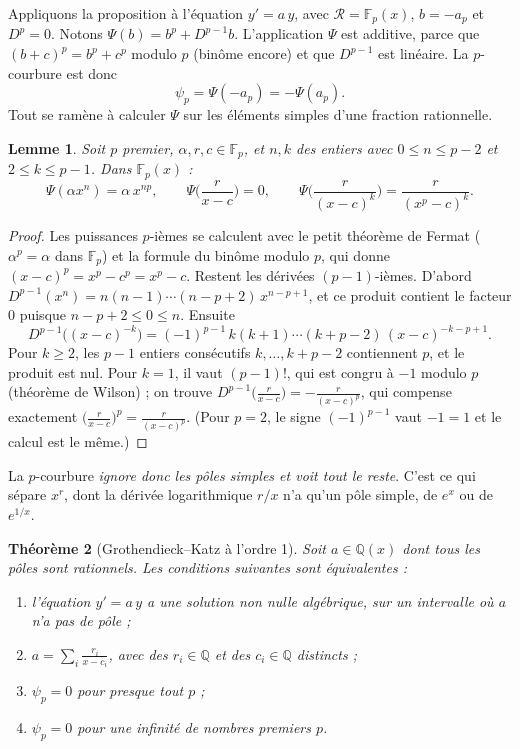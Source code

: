 \documentclass[11pt,a4paper]{article}
\theoremstyle{plain}
\newtheorem{theoreme}{Théorème}[section]
\newtheorem{lemme}[theoreme]{Lemme}
\theoremstyle{definition}
\theoremstyle{remark}
\newcommand{\Q}{\mathbb{Q}}
\newcommand{\F}{\mathbb{F}}
\newcommand{\Dx}{D}
\begin{document}
Appliquons la proposition à l'équation $y' = a\,y$, avec $\mathcal R = \F_p(x)$, $b = -a_p$ et $\Dx^p = 0$. Notons $\Psi(b) = b^p + \Dx^{p-1}b$. L'application $\Psi$ est additive, parce que $(b+c)^p = b^p + c^p$ modulo $p$ (binôme encore) et que $\Dx^{p-1}$ est linéaire. La $p$-courbure est donc
\[
  \psi_p = \Psi(-a_p) = -\Psi(a_p) .
\]
Tout se ramène à calculer $\Psi$ sur les éléments simples d'une fraction rationnelle.

\begin{lemme}\label{lem:psisimple}
Soit $p$ premier, $\alpha, r, c \in \F_p$, et $n, k$ des entiers avec $0 \leq n \leq p-2$ et $2 \leq k \leq p-1$. Dans $\F_p(x)$ :
\[
  \Psi(\alpha x^n) = \alpha\, x^{np}, \qquad
  \Psi\Big(\frac{r}{x-c}\Big) = 0, \qquad
  \Psi\Big(\frac{r}{(x-c)^k}\Big) = \frac{r}{(x^p - c)^k} .
\]
\end{lemme}

\begin{proof}
Les puissances $p$-ièmes se calculent avec le petit théorème de Fermat ($\alpha^p = \alpha$ dans $\F_p$) et la formule du binôme modulo $p$, qui donne $(x-c)^p = x^p - c^p = x^p - c$. Restent les dérivées $(p-1)$-ièmes. D'abord $\Dx^{p-1}(x^n) = n(n-1)\cdots(n-p+2)\,x^{n-p+1}$, et ce produit contient le facteur $0$ puisque $n - p + 2 \leq 0 \leq n$. Ensuite
\[
  \Dx^{p-1}\big((x-c)^{-k}\big) = (-1)^{p-1}\, k(k+1)\cdots(k+p-2)\, (x-c)^{-k-p+1} .
\]
Pour $k \geq 2$, les $p-1$ entiers consécutifs $k, \dots, k+p-2$ contiennent $p$, et le produit est nul. Pour $k = 1$, il vaut $(p-1)!$, qui est congru à $-1$ modulo $p$ (théorème de Wilson) ; on trouve $\Dx^{p-1}\big(\frac{r}{x-c}\big) = -\frac{r}{(x-c)^p}$, qui compense exactement $\big(\frac{r}{x-c}\big)^p = \frac{r}{(x-c)^p}$. (Pour $p = 2$, le signe $(-1)^{p-1}$ vaut $-1 = 1$ et le calcul est le même.)
\end{proof}

La $p$-courbure \emph{ignore donc les pôles simples et voit tout le reste}. C'est ce qui sépare $x^r$, dont la dérivée logarithmique $r/x$ n'a qu'un pôle simple, de $e^x$ ou de $e^{1/x}$.

\begin{theoreme}[Grothendieck--Katz à l'ordre 1]\label{thm:gkordre1}
Soit $a \in \Q(x)$ dont tous les pôles sont rationnels. Les conditions suivantes sont équivalentes :
\begin{enumerate}[nosep]
\item l'équation $y' = a\,y$ a une solution non nulle algébrique, sur un intervalle où $a$ n'a pas de pôle ;
\item $a = \sum_i \frac{r_i}{x - c_i}$, avec des $r_i \in \Q$ et des $c_i \in \Q$ distincts ;
\item $\psi_p = 0$ pour presque tout $p$ ;
\item $\psi_p = 0$ pour une infinité de nombres premiers $p$.
\end{enumerate}
\end{theoreme}
\end{document}
